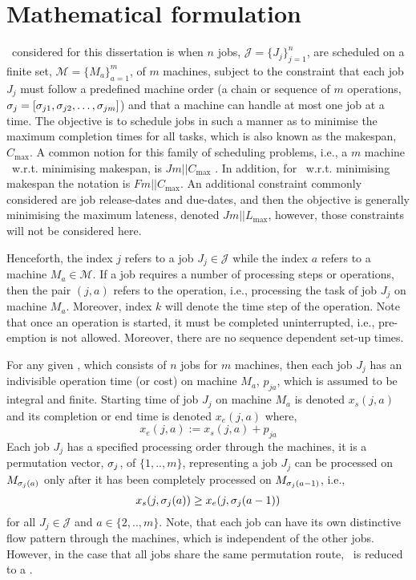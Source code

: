 \section{Mathematical formulation}
\Jsp\ considered for this dissertation is when $n$ jobs, 
$\mathcal{J}=\{J_j\}_{j=1}^n$, are scheduled on a finite set, 
$\mathcal{M}=\{M_a\}_{a=1}^m$, of $m$ machines, subject to the constraint that 
each job $J_j$ must follow a predefined machine order (a chain or sequence of 
$m$ operations, ${\mathbf{\sigma}}_j=[\sigma_{j1},\sigma_{j2},\dotsc,\sigma_{jm}]$) and 
that a machine can handle at most one job at a time. 
The objective is to schedule jobs in such a manner as to minimise the maximum completion times for all tasks, which is also known as the makespan, $C_{\max}$. A common notion for this family of scheduling problems, i.e., a $m$ machine \JSP\ w.r.t. minimising makespan, is $Jm||C_{\max}$ \citep[cf.][]{Pinedo08}. In addition, for \FSP\ w.r.t. minimising makespan the notation is $Fm||C_{\max}$. 
An additional constraint commonly considered are job release-dates and due-dates, and then the objective is generally minimising the maximum lateness, denoted $Jm||L_{\max}$, however, those  constraints will not be considered here. 

Henceforth, the index $j$ refers to a job $J_j\in\mathcal{J}$ while the index 
$a$ refers to a machine $M_a\in\mathcal{M}$. If a job requires a number of 
processing steps or operations, then the pair $(j,a)$ refers to the operation, 
i.e., processing the task of job $J_j$ on machine $M_a$. Moreover, index $k$ 
will denote the time step of the operation. Note that once an operation is 
started, it must be completed uninterrupted, i.e., pre-emption is not allowed. 
Moreover, there are no sequence dependent set-up times.

For any given \JSP, which consists of $n$ jobs for $m$ machines, then each job 
$J_j$ has an indivisible operation time (or cost) on machine $M_a$, $p_{ja}$, 
which is assumed to be integral and finite. 
Starting time of job $J_j$ on machine $M_a$ is denoted $x_s(j,a)$ and its 
completion or end time is denoted $x_e(j,a)$ where, 
\begin{equation}  x_e(j,a):=x_s(j,a)+p_{ja} \end{equation} 
Each job $J_j$ has a specified processing order through the machines, it is a permutation vector, ${\mathbf{\sigma}}_j$, of $\{1,..,m\}$, representing a job $J_j$ can be processed on $M_{{\mathbf{\sigma}}_j(a)}$ only after it has been completely processed on $M_{{\mathbf{\sigma}}_j(a-1)}$, i.e.,
\begin{equation}\label{eq:permutation}
	x_s(j,\vsigma_j(a)) \geq x_e(j,\vsigma_j(a-1)) 
\end{equation}
for all $J_j\in\mathcal{J}$ and $a\in\{2,..,m\}$. 
Note, that each job can have its own distinctive flow pattern through the 
machines, which is independent of the other jobs. However, in the case that all 
jobs share the same permutation route, \JSP\ is reduced to a \FSP.

